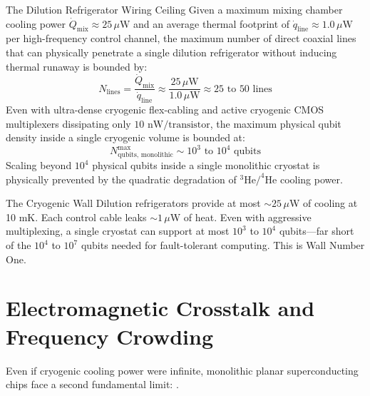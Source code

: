 \begin{theorembox}{The Dilution Refrigerator Wiring Ceiling}
Given a maximum mixing chamber cooling power $\dot{Q}_{\text{mix}} \approx 25\,\mu\text{W}$ and an average thermal footprint of $\dot{q}_{\text{line}} \approx 1.0\,\mu\text{W}$ per high-frequency control channel, the maximum number of direct coaxial lines that can physically penetrate a single dilution refrigerator without inducing thermal runaway is bounded by:
\begin{equation}
    N_{\text{lines}} = \frac{\dot{Q}_{\text{mix}}}{\dot{q}_{\text{line}}} \approx \frac{25\,\mu\text{W}}{1.0\,\mu\text{W}} \approx 25\text{ to }50\text{ lines}
\end{equation}
Even with ultra-dense cryogenic flex-cabling and active cryogenic CMOS multiplexers dissipating only $10\text{ nW/transistor}$, the maximum physical qubit density inside a single cryogenic volume is bounded at:
\begin{equation}
    N_{\text{qubits, monolithic}}^{\text{max}} \sim 10^3\text{ to }10^4\text{ qubits}
\end{equation}
Scaling beyond $10^4$ physical qubits inside a single monolithic cryostat is physically prevented by the quadratic degradation of $^3\text{He}/^4\text{He}$ cooling power.
\end{theorembox}

\begin{summarybox}{The Cryogenic Wall}
Dilution refrigerators provide at most $\sim 25\,\mu$W of cooling at 10 mK. Each control cable leaks $\sim 1\,\mu$W of heat. Even with aggressive multiplexing, a single cryostat can support at most $10^3$ to $10^4$ qubits---far short of the $10^4$ to $10^7$ qubits needed for fault-tolerant computing. This is Wall Number One.
\end{summarybox}


\section{Electromagnetic Crosstalk and Frequency Crowding}
\label{sec:crosstalk_crowding}

Even if cryogenic cooling power were infinite, monolithic planar superconducting chips face a second fundamental limit: .

